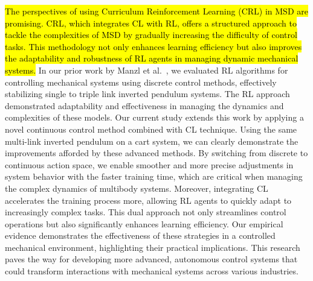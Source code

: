 \hl{The perspectives of using Curriculum Reinforcement Learning (CRL) in MSD are promising. CRL, which integrates CL with RL, offers a structured approach to tackle the complexities of MSD by gradually increasing the difficulty of control tasks. This methodology not only enhances learning efficiency but also improves the adaptability and robustness of RL agents in managing dynamic mechanical systems.} In our prior work by Manzl et al.~\cite{manzl2023relrl}, we evaluated RL algorithms for controlling mechanical systems using discrete control methods, effectively stabilizing single to triple link inverted pendulum systems. The RL approach demonstrated adaptability and effectiveness in managing the dynamics and complexities of these models. Our current study extends this work by applying a novel continuous control method combined with CL technique. Using the same multi-link inverted pendulum on a cart system, we can clearly demonstrate the improvements afforded by these advanced methods. By switching from discrete to continuous action space, we enable smoother and more precise adjustments in system behavior with the faster training time, which are critical when managing the complex dynamics of multibody systems. Moreover, integrating CL accelerates the training process more, allowing RL agents to quickly adapt to increasingly complex tasks. This dual approach not only streamlines control operations but also significantly enhances learning efficiency. Our empirical evidence demonstrates the effectiveness of these strategies in a controlled mechanical environment, highlighting their practical implications. This research paves the way for developing more advanced, autonomous control systems that could transform interactions with mechanical systems across various industries.
